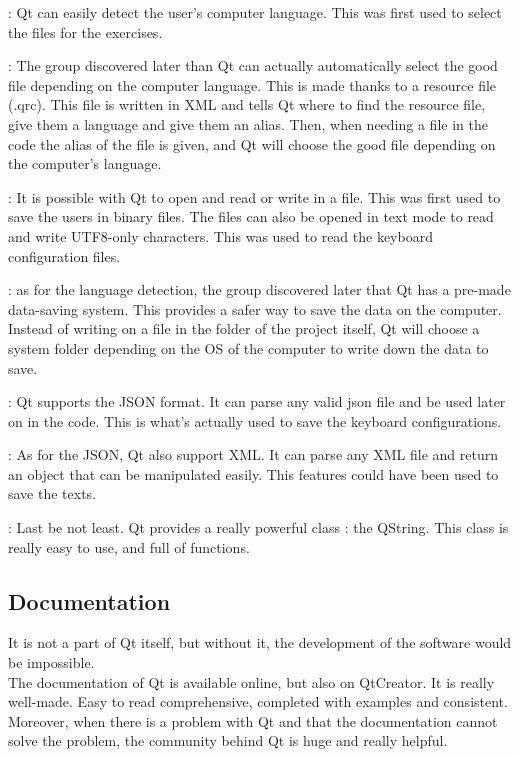 \begin{description}[align=left]
	\item[Language detection] : Qt can easily detect the user's computer language. This was first used to select the files for the exercises.
	\item[Resources files] : The group discovered later than Qt can actually automatically select the good file depending on the computer language. This is made thanks to a resource file (.qrc). This file is written in XML and tells Qt where to find the resource file, give them a language and give them an alias. Then, when needing a file in the code the alias of the file is given, and Qt will choose the good file depending on the computer's language.
	\item[DataStream] : It is possible with Qt to open and read or write in a file. This 	was first used to save the users in binary files. The files can also be opened in text mode to read and write UTF8-only characters. This was used to read the keyboard configuration files.
	\item[Qt Variant and metatypes] : as for the language detection, the group discovered later that Qt has a pre-made data-saving system. This provides a safer way to save the data on the computer. Instead of writing on a file in the folder of the project itself, Qt will choose a system folder depending on the OS of the computer to write down the data to save.
	\item[Json] : Qt supports the JSON format. It can parse any valid json file and be used later on in the code. This is what's actually used to save the keyboard configurations. 
	\item[XML] : As for the JSON, Qt also support XML. It can parse any XML file and return an object that can be manipulated easily. This features could have been used to save the texts.
	\item[QString] : Last be not least. Qt provides a really powerful class : the QString. This class is really easy to use, and full of functions.
\end{description}

\subsection{Documentation}
It is not a part of Qt itself, but without it, the development of the software would be impossible.\\
The documentation of Qt is available online, but also on QtCreator. It is really well-made. Easy to read comprehensive, completed with examples and consistent.\\
Moreover, when there is a problem with Qt and that the documentation cannot solve the problem, the community behind Qt is huge and really helpful.  

